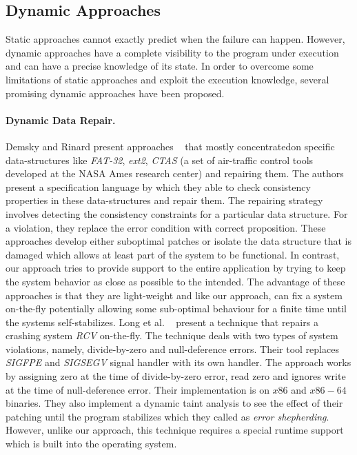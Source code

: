 \subsection{Dynamic Approaches}
Static approaches cannot exactly predict when the failure can happen. However,
dynamic approaches have a complete visibility to the program under execution and can
have a precise knowledge of its state. In order to overcome some limitations of static approaches
and exploit the execution knowledge, several promising dynamic approaches have
been proposed.
\paragraph{Dynamic Data Repair.}
Demsky and Rinard present approaches  ~\cite{
Demsky03automaticdata, conf/issre/DemskyR03,conf/oopsla/DemskyR03,
conf/issta/DemskyEGMPR06} that mostly concentratedon specific
data-structures like \emph{FAT-32}, \emph{ext2}, \emph{CTAS} (a set of
air-traffic control tools developed at the NASA Ames research center) and
repairing them. The authors present a specification language by which they
able to check consistency properties in these data-structures and repair them.
The repairing strategy involves detecting the consistency constraints for a
particular data structure. For a violation, they replace the error condition
with correct proposition.
These approaches develop either suboptimal patches or
isolate the data structure that is damaged which allows at least part of the
system to be functional. In contrast,
our approach tries to provide support to the entire application by trying to keep the system behavior
as close as possible to the intended. The advantage of these approaches is that they are
light-weight and like our approach, can fix a system on-the-fly
potentially allowing some sub-optimal behaviour for a finite time until the
systems self-stabilizes.
Long et al. ~\cite{conf/pldi/LongSR14}
present a technique that repairs a crashing system \emph{RCV} on-the-fly.
The technique deals with two types of system violations, namely, divide-by-zero and
null-deference errors. Their tool replaces \emph{SIGFPE} and \emph{SIGSEGV}
signal handler with its own handler. The approach works by assigning zero
at the time of divide-by-zero error, read zero and ignores write at the time of
null-deference error. Their implementation is on $x86$ and $x86-64$ binaries.
They also implement a dynamic taint analysis to see the effect of their
patching until the program stabilizes which they called as \emph{error
shepherding}. 
 However, unlike our approach, this technique requires a special runtime support which is 
built into the operating system.

